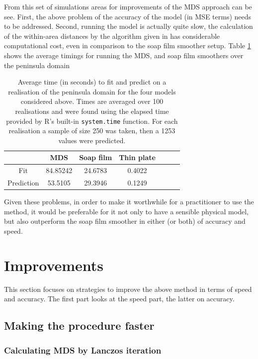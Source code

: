 From this set of simulations areas for improvements of the MDS approach can be see. First, the above problem of the accuracy of the model (in MSE terms) needs to be addressed. Second, running the model is actually quite slow, the calculation of the within-area distances by the algorithm given in  has considerable computational cost, even in comparison to the soap film smoother setup. Table \ref{wt2time} shows the average timings for running the MDS, \tprs and soap film smoothers over the peninsula domain

\begin{table}[ht]
\centering
\begin{tabular}{c || c c c c c c}
 & MDS & Soap film & Thin plate\\ 
\hline
Fit & 84.85242 & 24.6783 & 0.4022\\ 
Prediction &  53.5105 & 29.3946 & 0.1249\\
\end{tabular}
\label{wt2time}
\caption{Average time (in seconds) to fit and predict on a realisation of the peninsula domain for the four models considered above. Times are averaged over 100 realisations and were found using the elapsed time provided by \textsf{R}'s built-in \texttt{system.time} function. For each realisation a sample of size 250 was taken, then a 1253 values were predicted.}
\end{table}

Given these problems, in order to make it worthwhile for a practitioner to use the method, it would be preferable for it not only to have a sensible physical model, but also outperform the soap film smoother in either (or both) of accuracy and speed.




\section{Improvements}
\label{MDSimprov}

This section focuses on strategies to improve the above method in terms of speed and accuracy. The first part looks at the speed part, the latter on accuracy.

\subsection{Making the procedure faster}

\subsubsection{Calculating MDS by Lanczos iteration}

